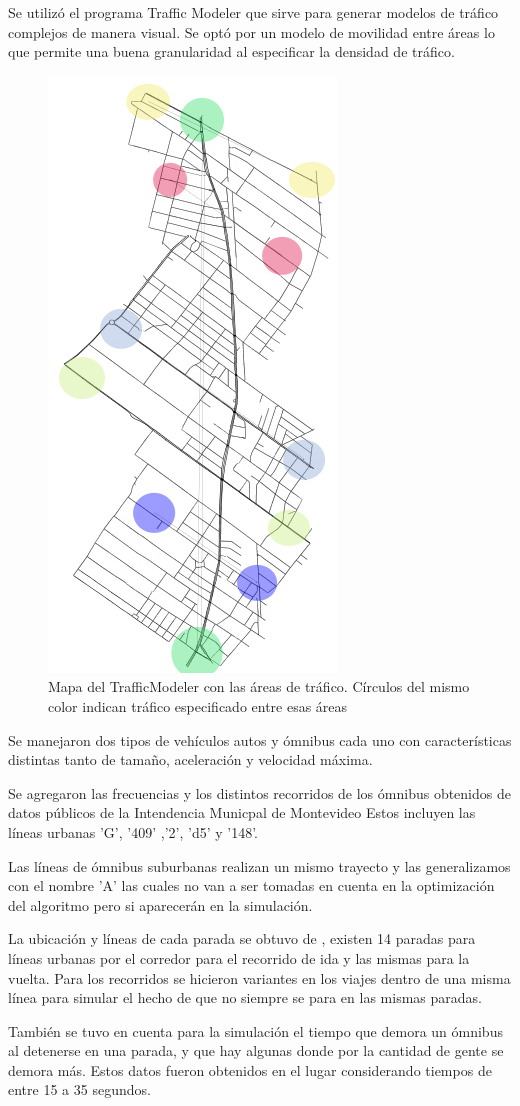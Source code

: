 Se utilizó el programa Traffic Modeler \citep{TrafficModeler} que sirve para generar modelos de tráfico complejos de manera visual. Se optó por un modelo de movilidad entre áreas lo que permite una buena granularidad al especificar la densidad de tráfico.


\begin{figure}[h]
	\centering
	\includegraphics[width=0.3\linewidth]{Figures/areaflow1}
	\caption{Mapa del TrafficModeler con las áreas de tráfico. Círculos del mismo color indican tráfico especificado entre esas áreas}
	\label{fig:areaflow1}
\end{figure}


Se manejaron dos tipos de vehículos autos y ómnibus cada uno con características distintas tanto de tamaño, aceleración y velocidad máxima.

Se agregaron las frecuencias y los distintos recorridos de los ómnibus obtenidos de datos públicos de la Intendencia Municpal de Montevideo \citep{IMM}
Estos incluyen las líneas urbanas  'G', '409' ,'2', 'd5'  y  '148'. 

Las líneas de ómnibus suburbanas realizan  un mismo  trayecto y las generalizamos con el nombre 'A' las cuales no van a ser tomadas en cuenta en la optimización del algoritmo pero si aparecerán en la simulación.

La ubicación y líneas de cada parada se obtuvo de \citep{sigMontevideo}, existen 14 paradas para líneas urbanas por el corredor para el recorrido de ida y las mismas para la vuelta.
Para los recorridos se hicieron  variantes  en  los  viajes  dentro  de  una  misma línea para simular el hecho de que no siempre se para en las mismas paradas.

También se tuvo en cuenta para la simulación el tiempo que demora un ómnibus al detenerse en una parada, y que hay algunas donde por la cantidad de gente se demora más. Estos datos fueron obtenidos en el lugar considerando tiempos de entre 15 a 35 segundos.

